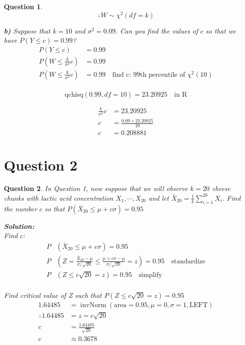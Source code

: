 \documentclass{article}
\theoremstyle{questionstyle}
\newtheorem{myquestion}{Question}
\begin{document}
\begin{myquestion}
\[\therefore W \sim \chi^2(df=k)\]



\textbf{b)} Suppose that \(k=10\) and \( \sigma^2 = 0.09 \). Can you find the values of \(c\) so that we have \(P(Y\leq c) = 0.99\)?\\

\begin{align*}
   P(Y \leq c)&= 0.99\\
   P\left( W \leq \frac{k}{\sigma^2}c \right) &= 0.99\\
   P\left( W \leq \frac{k}{\sigma^2}c \right) &= 0.99 \quad \text{find c: 99th percentile of } \chi^2(10) \\
\end{align*}

\[ \text{qchisq}(0.99, df=10) = 23.20925 \quad \text{in R} \]

\begin{align*}
   \frac{k}{\sigma^2}c &= 23.20925\\
   c &= \frac{0.09 \times 23.20925}{10}\\
   c &= 0.208881
\end{align*}

\end{myquestion}


\section{Question 2}
\begin{myquestion}
    In Question 1, now suppose that we will observe \( k = 20 \) cheese chunks with lactic acid concentration \( X_1, \cdots , X_{20} \) and let \( \bar{X}_{20} = \frac{1}{k}\sum_{i=1}^{20}X_i\). Find the number \(c\) so that \( P(\bar{X}_{20} \leq \mu + c\sigma ) = 0.95 \)

    
\textbf{Solution:}\\

Find \(c\): 
\begin{align*}
   P &(\bar{X}_{20} \leq \mu + c\sigma )= 0.95\\
   P &\left( Z = \frac{\bar{X}_{20} - \mu}{\sigma/\sqrt{20}} \leq \frac{\mu + c\sigma - \mu}{\sigma/\sqrt{20}} = z \right)= 0.95 \quad \text{standardize}\\
    P &\left( Z \leq c \sqrt{20} = z \right)= 0.95 \quad \text{simplify}\\
\end{align*}

Find critical value of Z such that \( P(Z \leq c\sqrt{20} = z) = 0.95\) \\
\begin{align*}
    1.64485 &= \operatorname{invNorm}\left(\text{area}=0.95, \mu=0, \sigma=1, \text{LEFT}\right)\\
    \therefore 1.64485 &= z = c\sqrt{20}\\
    c &= \frac{1.64485}{\sqrt{20}}\\
    c &\approx 0.3678
\end{align*}


\end{myquestion}
\end{document}
